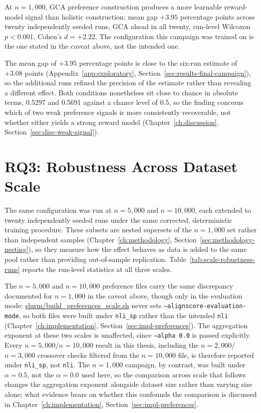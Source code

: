 \begin{keyfinding}
At $n=1{,}000$, GCA preference construction produces a more learnable
reward-model signal than holistic construction: mean gap $+3.95$
percentage points across twenty independently seeded runs, GCA ahead in
all twenty, run-level Wilcoxon $p<0.001$, Cohen's $d=+2.22$. The
configuration this campaign was trained on is the one stated in the
caveat above, not the intended one.
\end{keyfinding}

The mean gap of $+3.95$ percentage points is close to the six-run estimate of
$+3.08$ points (Appendix~\ref{app:exploratory},
Section~\ref{sec:results-final-campaign}), so the additional runs refined the
precision of the estimate rather than revealing a different effect. Both
conditions nonetheless sit close to chance in absolute terms, 0.5297 and 0.5691
against a chance level of 0.5, so the finding concerns which of two weak
preference signals is more consistently recoverable, not whether either yields a
strong reward model (Chapter~\ref{ch:discussion},
Section~\ref{sec:disc-weak-signal}).

\section{RQ3: Robustness Across Dataset Scale}
\label{sec:results-scale}

The same configuration was run at $n=5{,}000$ and $n=10{,}000$, each extended to
twenty independently seeded runs under the same corrected, deterministic
training procedure. These subsets are nested supersets of the $n=1{,}000$ set
rather than independent samples (Chapter~\ref{ch:methodology},
Section~\ref{sec:methodology-nesting}), so they measure how the effect behaves as
data is added to the same pool rather than providing out-of-sample replication.
Table~\ref{tab:scale-robustness-runs} reports the run-level statistics at all
three scales.

The $n=5{,}000$ and $n=10{,}000$ preference files carry the same discrepancy
documented for $n=1{,}000$ in the caveat above, though only in the
evaluation mode: \url{slurm/build_preferences_scale.sh} never sets
\texttt{--alignscore-evaluation-mode}, so both files were built under
\texttt{nli\_sp} rather than the intended \texttt{nli}
(Chapter~\ref{ch:implementation}, Section~\ref{sec:impl-preferences}). The
aggregation exponent at these two scales is unaffected, since
\texttt{--alpha 0.0} is passed explicitly. Every $n=5{,}000$/$n=10{,}000$ result
in this thesis, including the $n=2{,}000$/$n=3{,}000$ crossover checks
filtered from the $n=10{,}000$ file, is therefore reported under
\texttt{nli\_sp}, not \texttt{nli}. The $n=1{,}000$ campaign, by contrast, was
built under $\alpha=0.5$, not the $\alpha=0.0$ used here, so the comparison
across scale that follows changes the aggregation exponent alongside dataset
size rather than varying size alone; what evidence bears on whether this
confounds the comparison is discussed in Chapter~\ref{ch:implementation},
Section~\ref{sec:impl-preferences}.

